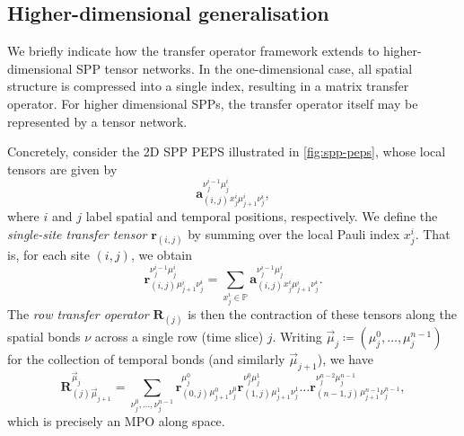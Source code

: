 \subsection{Higher-dimensional generalisation}
We briefly indicate how the transfer operator framework extends to higher-dimensional SPP tensor networks. In the one-dimensional case, all spatial structure is compressed into a single index, resulting in a matrix transfer operator. For higher dimensional SPPs, the transfer operator itself may be represented by a tensor network.

Concretely, consider the 2D SPP PEPS illustrated in \cref{fig:spp-peps}, whose local tensors are given by
\begin{equation}
    \mathbf{a}_{(i, j)}^{\nu^{i-1}_j\mu_j^i}{}_{x_j^i\mu_{j+1}^i\nu_j^i},
\end{equation}
where \(i\) and \(j\) label spatial and temporal positions, respectively.
We define the \emph{single-site transfer tensor} \(\mathbf{r}_{(i,j)}\) by summing over the local Pauli index \(x_j^i\). That is, for each site \((i,j)\), we obtain
\begin{equation}
    \mathbf{r}_{(i, j)}^{\nu^{i-1}_j\mu_j^i}{}_{\mu_{j+1}^i\nu_j^i} = 
    \sum_{x_j^i \in \mathbb{P}} \mathbf{a}_{(i, j)}^{\nu^{i-1}_j\mu_j^i}{}_{x_j^i\mu_{j+1}^i\nu_j^i}.
\end{equation}
The \emph{row transfer operator} \(\mathbf{R}_{(j)}\) is then the contraction of these tensors along the spatial bonds \(\nu\) across a single row (time slice) \(j\). Writing \(\vec{\mu}_j \coloneq (\mu_j^0, \dots, \mu_j^{n-1})\) for the collection of temporal bonds (and similarly \(\vec{\mu}_{j+1}\)), we have
\begin{equation}
    \mathbf{R}_{(j)}^{\vec{\mu}_j}{}_{\vec{\mu}_{j+1}} = 
    \sum_{\nu^0_j,\dots,\nu^{n-1}_j}
    \mathbf{r}_{(0, j)}^{\mu_j^0}{}_{\mu_{j+1}^0\nu_j^0}
    \mathbf{r}_{(1, j)}^{\nu^0_j\mu_j^1}{}_{\mu_{j+1}^1\nu_j^1}
    \dots
    \mathbf{r}_{(n-1, j)}^{\nu^{n-2}_j\mu_j^{n-1}}{}_{\mu_{j+1}^{n-1}\nu_j^{n-1}},
\end{equation}
which is precisely an MPO along space.

